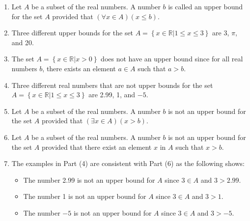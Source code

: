 \documentclass[11pt]{article}
\begin{document}
\begin{enumerate}
\item Let  $A$  be a subset of the real numbers.  A number  $b$  is called an upper bound for the set  $A$ provided that $\left( \forall x \in A\right) \left( x \leq b \right)$.

\item Three different upper bounds for the set  
$A = \left\{ {\left. {x \in \mathbb{R} } \right| 1 \leq x \leq 3} \right\}$
 are  3, $\pi $, and 20.

\item The set  $A = \left\{ {x \in \mathbb{R}\left.   \right| x > 0} \right\}$
 does not have an upper bound since for all real numbers  $b$, there exists an element  $a \in A$
 such that  $a > b$.

\item Three different real numbers that are not upper bounds for the set  
$A = \left\{ {\left. {x \in \mathbb{R} } \right| 1 \leq x \leq 3} \right\}$
 are 2.99, 1, and $-5$.

\item Let  $A$  be a subset of the real numbers.  A number  $b$  is not an upper bound for the set  $A$   provided that  $\left( \exists x \in A\right) \left( x > b \right)$.

\item Let  $A$  be a subset of the real numbers.  A number  $b$  is not an upper bound for the set  $A$  provided that there exist an element  $x$  in  $A$  such that  $x > b$.

\item The examples in Part (4) are consistent with  Part (6) as the following shows:

\begin{itemize}
\item The number 2.99  is not an upper bound for  $A$  since  $3 \in A$ and  $3 > 2.99$.

\item The number 1  is not an upper bound for  $A$  since  $3 \in A$ and  $3 > 1$.

\item The number $-5$  is not an upper bound for  $A$  since  $3 \in A$ and  $3 >  - 5$.
\end{itemize}

\end{enumerate}
\end{document}
